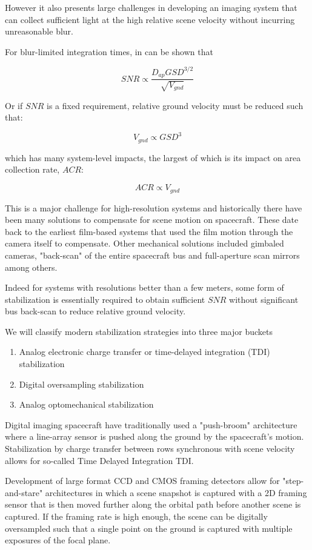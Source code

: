 \documentclass[10pt,journal]{IEEEtran}  %
\begin{document}
However it also presents large challenges in developing an imaging system that can collect sufficient light at the high relative scene velocity without incurring unreasonable blur.

For blur-limited integration times, in can be shown that \cite{shaw}

$$SNR \propto \frac{D_{ap} GSD^{3/2}}{\sqrt{V_{gnd}}}$$

Or if $SNR$ is a fixed requirement, relative ground velocity must be reduced such that:

\begin{equation}
V_{gnd} \propto GSD^3
\end{equation}

which has many system-level impacts, the largest of which is its impact on area collection rate, $ACR$:

$$ACR \propto V_{gnd}$$

This is a major challenge for high-resolution systems and historically there have been many solutions to compensate for scene motion on spacecraft.  These date back to the earliest film-based systems that used the film motion through the camera itself to compensate.  Other mechanical solutions included gimbaled cameras, "back-scan" of the entire spacecraft bus and full-aperture scan mirrors among others.

Indeed for systems with resolutions better than a few meters, some form of stabilization is essentially required to obtain sufficient $SNR$ without significant bus back-scan to reduce relative ground velocity.

We will classify modern stabilization strategies into three major buckets

\begin{enumerate}
\item Analog electronic charge transfer or time-delayed integration (TDI) stabilization
\item Digital oversampling stabilization
\item Analog optomechanical stabilization
\end{enumerate}

Digital imaging spacecraft have traditionally used a "push-broom" architecture where a line-array sensor is pushed along the ground by the spacecraft's motion.  Stabilization by charge transfer between rows synchronous with scene velocity allows for so-called Time Delayed Integration TDI.  

Development of large format CCD and CMOS framing detectors allow for  "step-and-stare" architectures in which a scene snapshot is captured with a 2D framing sensor that is then moved further along the orbital path before another scene is captured.  If the framing rate is high enough, the scene can be digitally oversampled such that a single point on the ground is captured with multiple exposures of the focal plane.
\end{document}
